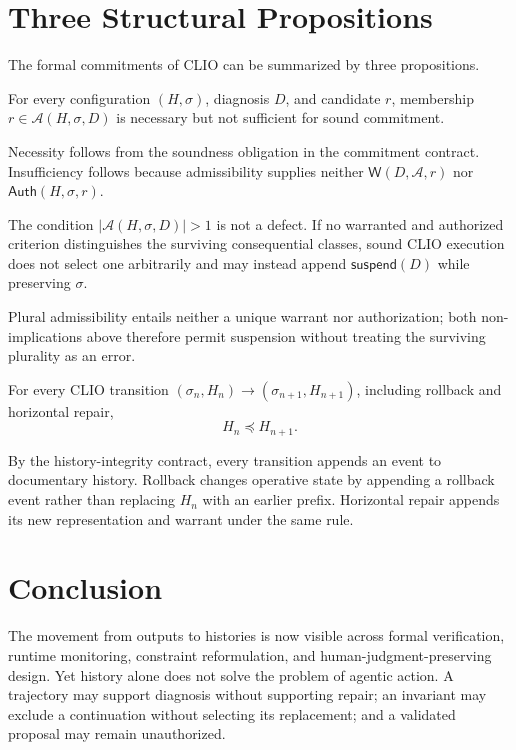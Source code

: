 \section{Three Structural Propositions}

The formal commitments of CLIO can be summarized by three propositions.

\begin{proposition}[Admissibility]
For every configuration $(H,\sigma)$, diagnosis $D$, and candidate $r$, membership $r \in \mathcal{A}(H,\sigma,D)$ is necessary but not sufficient for sound commitment.
\end{proposition}

Necessity follows from the soundness obligation in the commitment contract. Insufficiency follows because admissibility supplies neither $\mathsf{W}(D,\mathcal{A},r)$ nor $\mathsf{Auth}(H,\sigma,r)$.

\begin{proposition}
The condition $|\mathcal{A}(H,\sigma,D)| > 1$ is not a defect. If no warranted and authorized criterion distinguishes the surviving consequential classes, sound CLIO execution does not select one arbitrarily and may instead append $\mathsf{suspend}(D)$ while preserving $\sigma$.
\end{proposition}

Plural admissibility entails neither a unique warrant nor authorization; both non-implications above therefore permit suspension without treating the surviving plurality as an error.

\begin{proposition}
For every CLIO transition $(\sigma_n,H_n) \to (\sigma_{n+1},H_{n+1})$, including rollback and horizontal repair,
\[
H_n \preceq H_{n+1}.
\]
\end{proposition}

By the history-integrity contract, every transition appends an event to documentary history. Rollback changes operative state by appending a rollback event rather than replacing $H_n$ with an earlier prefix. Horizontal repair appends its new representation and warrant under the same rule.

\section{Conclusion}

The movement from outputs to histories is now visible across formal verification, runtime monitoring, constraint reformulation, and human-judgment-preserving design. Yet history alone does not solve the problem of agentic action. A trajectory may support diagnosis without supporting repair; an invariant may exclude a continuation without selecting its replacement; and a validated proposal may remain unauthorized.

